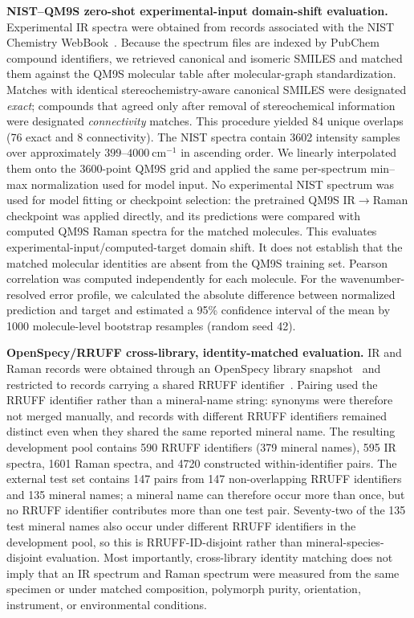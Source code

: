 \documentclass[pdflatex,sn-mathphys-num]{sn-jnl}%
\theoremstyle{thmstyleone}%
\theoremstyle{thmstyletwo}%
\theoremstyle{thmstylethree}%
\begin{document}
\noindent\textbf{NIST--QM9S zero-shot experimental-input domain-shift evaluation.}
Experimental IR spectra were obtained from records associated with the NIST Chemistry WebBook~\citep{nistwebbook}. Because the spectrum files are indexed by PubChem compound identifiers, we retrieved canonical and isomeric SMILES and matched them against the QM9S molecular table after molecular-graph standardization. Matches with identical stereochemistry-aware canonical SMILES were designated \emph{exact}; compounds that agreed only after removal of stereochemical information were designated \emph{connectivity} matches. This procedure yielded 84 unique overlaps (76 exact and 8 connectivity). The NIST spectra contain 3602 intensity samples over approximately $399$--$4000~\mathrm{cm}^{-1}$ in ascending order. We linearly interpolated them onto the 3600-point QM9S grid and applied the same per-spectrum min--max normalization used for model input. No experimental NIST spectrum was used for model fitting or checkpoint selection: the pretrained QM9S IR$\rightarrow$Raman checkpoint was applied directly, and its predictions were compared with computed QM9S Raman spectra for the matched molecules. This evaluates experimental-input/computed-target domain shift. It does not establish that the matched molecular identities are absent from the QM9S training set. Pearson correlation was computed independently for each molecule. For the wavenumber-resolved error profile, we calculated the absolute difference between normalized prediction and target and estimated a 95\% confidence interval of the mean by 1000 molecule-level bootstrap resamples (random seed 42).

\noindent\textbf{OpenSpecy/RRUFF cross-library, identity-matched evaluation.}
IR and Raman records were obtained through an OpenSpecy library snapshot~\citep{cowger2021openspecy} and restricted to records carrying a shared RRUFF identifier~\citep{lafuente2015rruff}. Pairing used the RRUFF identifier rather than a mineral-name string: synonyms were therefore not merged manually, and records with different RRUFF identifiers remained distinct even when they shared the same reported mineral name. The resulting development pool contains 590 RRUFF identifiers (379 mineral names), 595 IR spectra, 1601 Raman spectra, and 4720 constructed within-identifier pairs. The external test set contains 147 pairs from 147 non-overlapping RRUFF identifiers and 135 mineral names; a mineral name can therefore occur more than once, but no RRUFF identifier contributes more than one test pair. Seventy-two of the 135 test mineral names also occur under different RRUFF identifiers in the development pool, so this is RRUFF-ID-disjoint rather than mineral-species-disjoint evaluation. Most importantly, cross-library identity matching does not imply that an IR spectrum and Raman spectrum were measured from the same specimen or under matched composition, polymorph purity, orientation, instrument, or environmental conditions.
\end{document}
